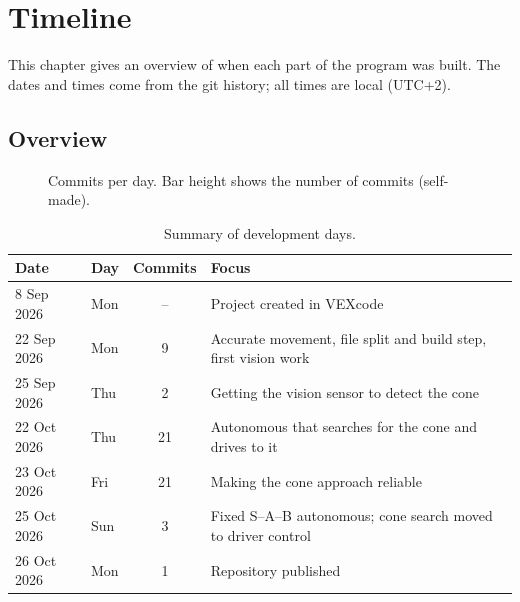 \chapter{Timeline}
\label{ch:timeline}

This chapter gives an overview of when each part of the program was built. The
dates and times come from the git history; all times are local (UTC+2).

\section{Overview}

\begin{figure}[h]
  \centering
  \caption{Commits per day. Bar height shows the number of commits (self-made).}
  \label{fig:timeline}
\end{figure}

\begin{table}[h]
  \centering
  \begin{tabularx}{\textwidth}{@{}llcX@{}}
    \toprule
    Date & Day & Commits & Focus \\
    \midrule
    8 Sep 2026  & Mon & --  & Project created in VEXcode \\
    22 Sep 2026 & Mon & 9   & Accurate movement, file split and build step, first vision work \\
    25 Sep 2026 & Thu & 2   & Getting the vision sensor to detect the cone \\
    22 Oct 2026 & Thu & 21  & Autonomous that searches for the cone and drives to it \\
    23 Oct 2026 & Fri & 21  & Making the cone approach reliable \\
    25 Oct 2026 & Sun & 3   & Fixed S--A--B autonomous; cone search moved to driver control \\
    26 Oct 2026 & Mon & 1   & Repository published \\
    \bottomrule
  \end{tabularx}
  \caption{Summary of development days.}
  \label{tab:days}
\end{table}

